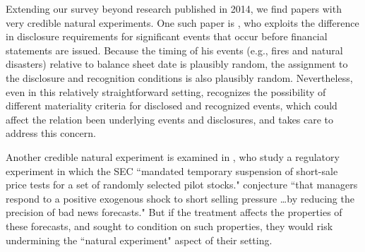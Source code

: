 \documentclass[12pt,reqno,titlepage]{amsart}
\begin{document}
\begin{doublespace}

Extending our survey beyond research published in 2014, we find papers with very credible natural experiments.
One such paper is \citet{Michels:2015aa}, who exploits the difference in disclosure requirements for significant events that occur before financial statements are issued. 
Because the timing of his events (e.g., fires and natural disasters) relative to balance sheet date is plausibly random, the assignment to the disclosure and recognition conditions is also plausibly random. 
Nevertheless, even in this relatively straightforward setting, \citet{Michels:2015aa} recognizes the possibility of different materiality criteria for disclosed and recognized events, which could affect the relation been underlying events and disclosures, and takes care to address this concern.

Another credible natural experiment is examined in \citet[p.\,80]{Li:2015he}, who study a regulatory experiment in which the SEC ``mandated temporary suspension of short-sale price tests for a set of randomly selected pilot stocks." 
\citet[p.\,79]{Li:2015he} conjecture ``that managers respond to a positive exogenous shock to short selling pressure \dots by reducing the precision of bad news forecasts." 
But if the treatment affects the properties of these forecasts, and \citet[p.\,79]{Li:2015he} sought to condition on such properties, they would risk undermining the ``natural experiment" aspect of their setting.



\end{doublespace}
\end{document}
